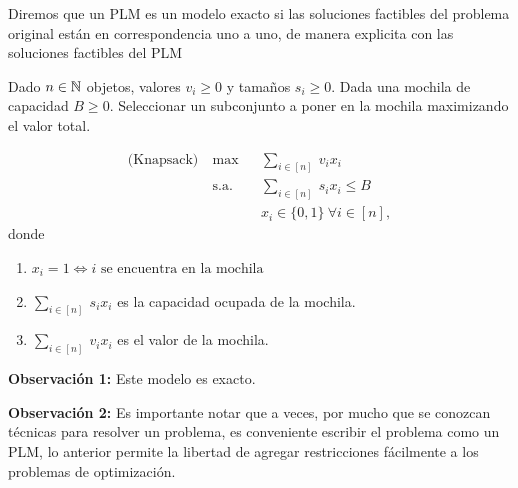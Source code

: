 \begin{defi} Diremos que un PLM es un modelo exacto si las soluciones factibles del problema original están en correspondencia uno a uno, de manera explicita con las soluciones factibles del PLM
\end{defi}

\begin{eje} Dado $n \in \mathbb N$ objetos, valores $v_{i} \geq 0$ y tamaños $s_{i} \geq 0$. Dada una mochila de capacidad $B \geq 0$. Seleccionar un subconjunto a poner en la mochila maximizando el valor total.

\begin{equation*}
\begin{aligned}
\textrm{(Knapsack)}~ & \max
& & \displaystyle{\sum_{i \in [n]}}~v_{i}x_{i}\\
& \text{s.a.}
& & \displaystyle{\sum_{i \in [n]}}~s_{i}x_{i} \leq B\\
&&& x_{i} \in\{0,1\} ~ \forall i \in [n],
\end{aligned}
\end{equation*}
\newpage
donde
\begin{enumerate}
    \item $x_{i}=1 \iff i \text{  se encuentra en la mochila}$
    \item $\displaystyle{\sum_{i \in [n]}}~s_{i}x_{i}$ es la capacidad ocupada de la mochila.
    \item $\displaystyle{\sum_{i \in [n]}}~v_{i}x_{i}$ es el valor de la mochila.
\end{enumerate}

\end{eje}

\textbf{Observación 1:} Este modelo es exacto.

\textbf{Observación 2:} Es importante notar que a veces, por mucho que se conozcan técnicas para resolver un problema, es conveniente escribir el problema como un PLM, lo anterior permite la libertad de agregar restricciones fácilmente a los problemas de optimización.

